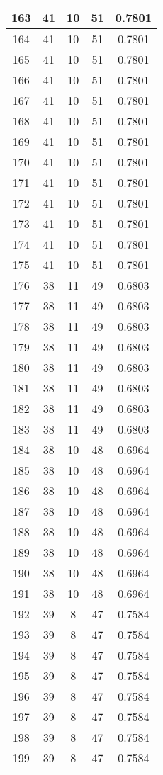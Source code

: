 \documentclass[letterpaper, 12pt]{article}
\begin{document}
\begin{longtable}{|c|c|c|c|c|}
\hline
163 & 41 & 10 & 51 & 0.7801 \\
\hline
164 & 41 & 10 & 51 & 0.7801 \\
\hline
165 & 41 & 10 & 51 & 0.7801 \\
\hline
166 & 41 & 10 & 51 & 0.7801 \\
\hline
167 & 41 & 10 & 51 & 0.7801 \\
\hline
168 & 41 & 10 & 51 & 0.7801 \\
\hline
169 & 41 & 10 & 51 & 0.7801 \\
\hline
170 & 41 & 10 & 51 & 0.7801 \\
\hline
171 & 41 & 10 & 51 & 0.7801 \\
\hline
172 & 41 & 10 & 51 & 0.7801 \\
\hline
173 & 41 & 10 & 51 & 0.7801 \\
\hline
174 & 41 & 10 & 51 & 0.7801 \\
\hline
175 & 41 & 10 & 51 & 0.7801 \\
\hline
176 & 38 & 11 & 49 & 0.6803 \\
\hline
177 & 38 & 11 & 49 & 0.6803 \\
\hline
178 & 38 & 11 & 49 & 0.6803 \\
\hline
179 & 38 & 11 & 49 & 0.6803 \\
\hline
180 & 38 & 11 & 49 & 0.6803 \\
\hline
181 & 38 & 11 & 49 & 0.6803 \\
\hline
182 & 38 & 11 & 49 & 0.6803 \\
\hline
183 & 38 & 11 & 49 & 0.6803 \\
\hline
184 & 38 & 10 & 48 & 0.6964 \\
\hline
185 & 38 & 10 & 48 & 0.6964 \\
\hline
186 & 38 & 10 & 48 & 0.6964 \\
\hline
187 & 38 & 10 & 48 & 0.6964 \\
\hline
188 & 38 & 10 & 48 & 0.6964 \\
\hline
189 & 38 & 10 & 48 & 0.6964 \\
\hline
190 & 38 & 10 & 48 & 0.6964 \\
\hline
191 & 38 & 10 & 48 & 0.6964 \\
\hline
192 & 39 & 8 & 47 & 0.7584 \\
\hline
193 & 39 & 8 & 47 & 0.7584 \\
\hline
194 & 39 & 8 & 47 & 0.7584 \\
\hline
195 & 39 & 8 & 47 & 0.7584 \\
\hline
196 & 39 & 8 & 47 & 0.7584 \\
\hline
197 & 39 & 8 & 47 & 0.7584 \\
\hline
198 & 39 & 8 & 47 & 0.7584 \\
\hline
199 & 39 & 8 & 47 & 0.7584 \\
\hline
\end{longtable}
\end{document}
